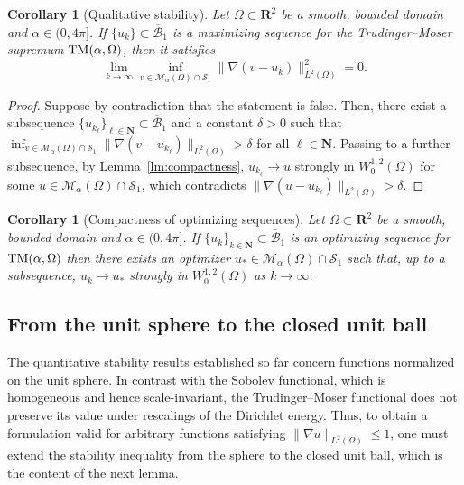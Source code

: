 \documentclass[reqno,11pt]{amsart}
\newtheorem{corollary}[theorem]{Corollary}
\theoremstyle{definition}
\begin{document}
\begin{corollary}[Qualitative stability]\label{maxseqconv}
    Let $\Omega\subset\mathbf{R}^2$ be a smooth, bounded domain and $\alpha\in (0,4\pi]$.
    If $\{u_k\} \subset \overline{\mathcal{B}}_1$ is a maximizing sequence for the Trudinger--Moser supremum ${\rm TM}(\alpha,\Omega)$, then it satisfies
    \[
    \lim_{k\rightarrow \infty}\inf_{v \in \mathcal{M}_\alpha(\Omega)\cap \mathcal{S}_1} \|\nabla (v-u_k)\|_{L^2(\Omega)}^2=0.
    \]
\end{corollary}

\begin{proof}
    Suppose by contradiction that the statement is false. Then, there exist a subsequence $\{u_{k_\ell}\}_{\ell\in\mathbf{N}}\subset \overline{\mathcal{B}}_1$ and a constant $\delta > 0$ such that $\inf_{v\in\mathcal{M}_\alpha(\Omega)\cap\mathcal{S}_1}\|\nabla(v-u_{k_\ell})\|_{L^2(\Omega)} > \delta$ for all $\ell\in\mathbf{N}$. Passing to a further subsequence, by Lemma~\ref{lm:compactness}, $u_{k_\ell} \rightarrow u$ strongly in $W_0^{1,2}(\Omega)$ for some $u\in\mathcal{M}_\alpha(\Omega)\cap\mathcal{S}_1$, which contradicts $\|\nabla(u-u_{k_\ell})\|_{L^2(\Omega)}>\delta$.
\end{proof}

\begin{corollary}[Compactness of optimizing sequences]\label{co:compactness}
		Let $\Omega\subset\mathbf{R}^2$ be a smooth, bounded domain and $\alpha\in (0,4\pi]$.
        If $\{u_k\}_{k\in\mathbf{N}} \subset \overline{\mathcal{B}}_1$ is an optimizing sequence for ${\rm TM}(\alpha,\Omega)$  then there exists an optimizer $u_*\in \mathcal{M}_\alpha(\Omega)\cap \mathcal{S}_1$ such that, up to a subsequence, $u_k \rightarrow u_*$ strongly in $W^{1,2}_0(\Omega)$ as $k\to\infty$.
	\end{corollary}

\subsection{From the unit sphere to the closed unit ball}
The quantitative stability results established so far concern functions normalized
on the unit sphere.
In contrast with the Sobolev functional, which is homogeneous and hence scale-invariant,
the Trudinger--Moser functional does not preserve its value under rescalings of the Dirichlet energy.
Thus, to obtain a formulation valid for arbitrary functions satisfying
$\|\nabla u\|_{L^2(\Omega)}\le1$, one must extend the stability inequality from the sphere to the closed unit ball, which is the content of the next lemma.
\end{document}
